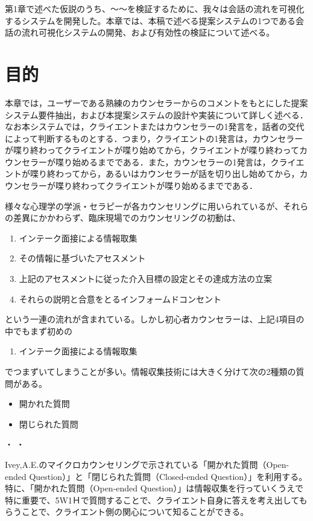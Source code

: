 \documentclass[shuuron]{kuee}
\begin{document}
第1章で述べた仮説のうち、〜〜を検証するために、我々は会話の流れを可視化するシステムを開発した。本章では、本稿で述べる提案システムの1つである会話の流れ可視化システムの開発、および有効性の検証について述べる。
\section{目的}

本章では，ユーザーである熟練のカウンセラーからのコメントをもとにした提案システム要件抽出，および本提案システムの設計や実装について詳しく述べる．なお本システムでは，クライエントまたはカウンセラーの1発言を，話者の交代によって判断するものとする．つまり，クライエントの1発言は，カウンセラーが喋り終わってクライエントが喋り始めてから，クライエントが喋り終わってカウンセラーが喋り始めるまでである．また，カウンセラーの1発言は，クライエントが喋り終わってから，あるいはカウンセラーが話を切り出し始めてから，カウンセラーが喋り終わってクライエントが喋り始めるまでである．


様々な心理学の学派・セラピーが各カウンセリングに用いられているが、それらの差異にかかわらず、臨床現場でのカウンセリングの初動は、

\begin{enumerate}
 \item インテーク面接による情報取集
 \item その情報に基づいたアセスメント
 \item 上記のアセスメントに従った介入目標の設定とその達成方法の立案
 \item それらの説明と合意をとるインフォームドコンセント
\end{enumerate}
という一連の流れが含まれている。しかし初心者カウンセラーは、上記4項目の中でもまず初めの
\begin{enumerate}
 \item インテーク面接による情報取集
\end{enumerate}
でつまずいてしまうことが多い。情報収集技術には大きく分けて次の2種類の質問がある。
\begin{itemize}
\item 開かれた質問
\item 閉じられた質問
\end{itemize}
・
・


Ivey,A.E.\cite{ivey}のマイクロカウンセリングで示されている「開かれた質問（Open-ended Question）」と「閉じられた質問（Closed-ended Question）」を利用する。特に、「開かれた質問（Open-ended Question）」は情報収集を行っていくうえで特に重要で、5W1Ｈで質問することで、クライエント自身に答えを考え出してもらうことで、クライエント側の関心について知ることができる。　　　　　　　　　　　　　　　　　　　　　　　　　　　　　　　　　　　　　　　　　　　　　　　　　　　　　　　　　　　　　　　　　　　　　　　　　　　　
\end{document}

